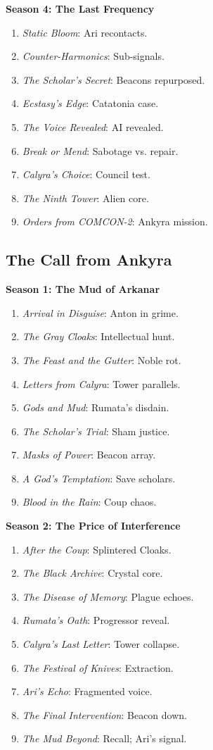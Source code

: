 \documentclass[10pt,letterpaper]{article}
\begin{document}
\begin{paracol}{2}
\textbf{Season 4: The Last Frequency}
\begin{enumerate}
    \item \textit{Static Bloom}: Ari recontacts.
    \item \textit{Counter-Harmonics}: Sub-signals.
    \item \textit{The Scholar’s Secret}: Beacons repurposed.
    \item \textit{Ecstasy’s Edge}: Catatonia case.
    \item \textit{The Voice Revealed}: AI revealed.
    \item \textit{Break or Mend}: Sabotage vs. repair.
    \item \textit{Calyra’s Choice}: Council test.
    \item \textit{The Ninth Tower}: Alien core.
    \item \textit{Orders from COMCON-2}: Ankyra mission.
\end{enumerate}

\subsection{The Call from Ankyra}
\textbf{Season 1: The Mud of Arkanar}
\begin{enumerate}
    \item \textit{Arrival in Disguise}: Anton in grime.
    \item \textit{The Gray Cloaks}: Intellectual hunt.
    \item \textit{The Feast and the Gutter}: Noble rot.
    \item \textit{Letters from Calyra}: Tower parallels.
    \item \textit{Gods and Mud}: Rumata’s disdain.
    \item \textit{The Scholar’s Trial}: Sham justice.
    \item \textit{Masks of Power}: Beacon array.
    \item \textit{A God’s Temptation}: Save scholars.
    \item \textit{Blood in the Rain}: Coup chaos.
\end{enumerate}

\textbf{Season 2: The Price of Interference}
\begin{enumerate}
    \item \textit{After the Coup}: Splintered Cloaks.
    \item \textit{The Black Archive}: Crystal core.
    \item \textit{The Disease of Memory}: Plague echoes.
    \item \textit{Rumata’s Oath}: Progressor reveal.
    \item \textit{Calyra’s Last Letter}: Tower collapse.
    \item \textit{The Festival of Knives}: Extraction.
    \item \textit{Ari’s Echo}: Fragmented voice.
    \item \textit{The Final Intervention}: Beacon down.
    \item \textit{The Mud Beyond}: Recall; Ari’s signal.
\end{enumerate}


\end{paracol}
\end{document}
